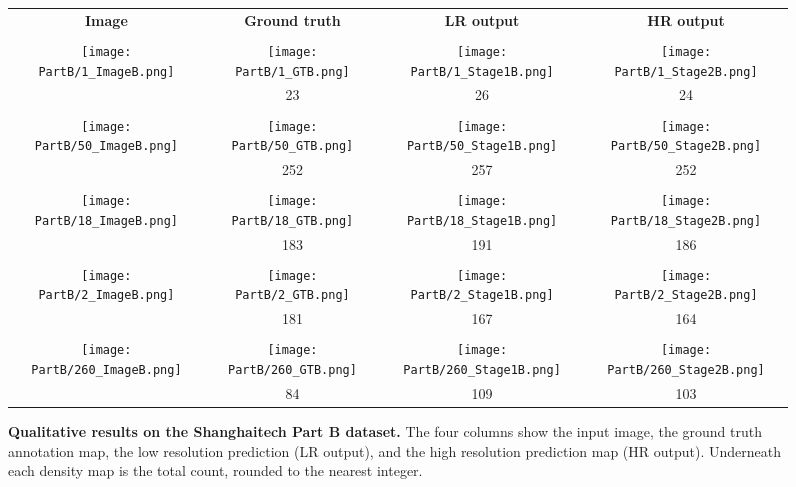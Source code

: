 \documentclass[runningheads]{llncs}
\begin{document}
\setlength{\tabcolsep}{3pt}
\begin{figure}[!thb]
\begin{tabular}{cccc} 

{\bf Image} & {\bf Ground truth} & {\bf LR output} & {\bf HR  output} \\ \\ 
{  
	\texttt{[image: PartB/1\_ImageB.png]}
     } &  {  
	\texttt{[image: PartB/1\_GTB.png]}
     }
     &
     {\texttt{[image: PartB/1\_Stage1B.png]}
     } & 
     {\texttt{[image: PartB/1\_Stage2B.png]}
     } \\
    &23  & 26 & 24\\
   \\ 


{  
	\texttt{[image: PartB/50\_ImageB.png]}
     } &  {  
	\texttt{[image: PartB/50\_GTB.png]}
     }
     &
     {\texttt{[image: PartB/50\_Stage1B.png]}
     } & 
     {\texttt{[image: PartB/50\_Stage2B.png]}
     } \\
    &252  & 257 & 252\\
   \\ 

{  
	\texttt{[image: PartB/18\_ImageB.png]}
     } &  {  
	\texttt{[image: PartB/18\_GTB.png]}
     }
     &
     {\texttt{[image: PartB/18\_Stage1B.png]}
     } & 
     {\texttt{[image: PartB/18\_Stage2B.png]}
     } \\
    &183  & 191 &186\\
   \\ 
{  
	\texttt{[image: PartB/2\_ImageB.png]}
     } &  {  
	\texttt{[image: PartB/2\_GTB.png]}
     }
     &
     {\texttt{[image: PartB/2\_Stage1B.png]}
     } & 
     {\texttt{[image: PartB/2\_Stage2B.png]}
     } \\
    &181  & 167 & 164\\
   \\ 
   

   {  
	\texttt{[image: PartB/260\_ImageB.png]}
     } &  {  
	\texttt{[image: PartB/260\_GTB.png]} 
     }
     &
     {\texttt{[image: PartB/260\_Stage1B.png]}
     } & 
     {\texttt{[image: PartB/260\_Stage2B.png]}
     } \\
    &84 & 109 & 103\\
\end{tabular}
\caption{{\bf Qualitative results on the Shanghaitech Part B dataset.} The four columns show the input image, the ground truth annotation map, the low resolution prediction (LR output), and the high resolution prediction map (HR output). Underneath each density map is the total count, rounded to the nearest integer.\label{quali2}}
\vskip -0.2in
\end{figure}
\end{document}
